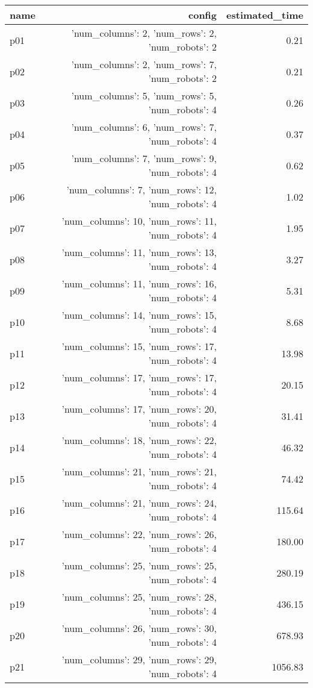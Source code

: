 \documentclass{article}
\begin{document}
                            \begin{center}
                            \scriptsize
                            \begin{tabular}{@{}l|r|r@{}}
                            name & config & estimated\_time\\\midrule
                              p01&{'num\_columns': 2, 'num\_rows': 2, 'num\_robots': 2}&0.21\\
  p02&{'num\_columns': 2, 'num\_rows': 7, 'num\_robots': 2}&0.21\\
  p03&{'num\_columns': 5, 'num\_rows': 5, 'num\_robots': 4}&0.26\\
  p04&{'num\_columns': 6, 'num\_rows': 7, 'num\_robots': 4}&0.37\\
  p05&{'num\_columns': 7, 'num\_rows': 9, 'num\_robots': 4}&0.62\\
  p06&{'num\_columns': 7, 'num\_rows': 12, 'num\_robots': 4}&1.02\\
  p07&{'num\_columns': 10, 'num\_rows': 11, 'num\_robots': 4}&1.95\\
  p08&{'num\_columns': 11, 'num\_rows': 13, 'num\_robots': 4}&3.27\\
  p09&{'num\_columns': 11, 'num\_rows': 16, 'num\_robots': 4}&5.31\\
  p10&{'num\_columns': 14, 'num\_rows': 15, 'num\_robots': 4}&8.68\\
  p11&{'num\_columns': 15, 'num\_rows': 17, 'num\_robots': 4}&13.98\\
  p12&{'num\_columns': 17, 'num\_rows': 17, 'num\_robots': 4}&20.15\\
  p13&{'num\_columns': 17, 'num\_rows': 20, 'num\_robots': 4}&31.41\\
  p14&{'num\_columns': 18, 'num\_rows': 22, 'num\_robots': 4}&46.32\\
  p15&{'num\_columns': 21, 'num\_rows': 21, 'num\_robots': 4}&74.42\\
  p16&{'num\_columns': 21, 'num\_rows': 24, 'num\_robots': 4}&115.64\\
  p17&{'num\_columns': 22, 'num\_rows': 26, 'num\_robots': 4}&180.00\\
  p18&{'num\_columns': 25, 'num\_rows': 25, 'num\_robots': 4}&280.19\\
  p19&{'num\_columns': 25, 'num\_rows': 28, 'num\_robots': 4}&436.15\\
  p20&{'num\_columns': 26, 'num\_rows': 30, 'num\_robots': 4}&678.93\\
  p21&{'num\_columns': 29, 'num\_rows': 29, 'num\_robots': 4}&1056.83\\

\end{tabular}
\end{center}
\end{document}
